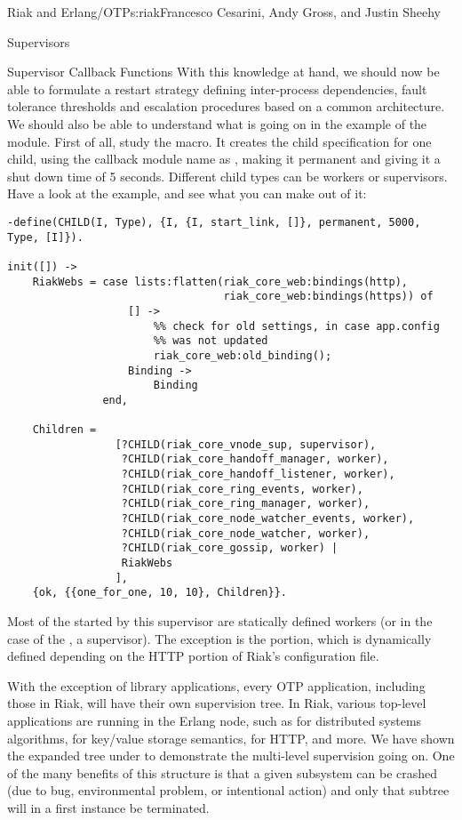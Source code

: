 \begin{aosachapter}{Riak and Erlang/OTP}{s:riak}{Francesco Cesarini, Andy Gross, and Justin Sheehy}
\begin{aosasect1}{Supervisors}
\begin{aosasect2}{Supervisor Callback Functions}
With this knowledge at hand, we should now be able to formulate a
restart strategy defining inter-process dependencies, fault tolerance
thresholds and escalation procedures based on a common
architecture. We should also be able to understand what is going on in
the  example of the 
module. First of all, study the  macro. It creates the
child specification for one child, using the callback module name as
, making it permanent and giving it a shut down time of 5
seconds. Different child types can be workers or supervisors. Have a
look at the example, and see what you can make out of it:

\begin{verbatim}
-define(CHILD(I, Type), {I, {I, start_link, []}, permanent, 5000, Type, [I]}).

init([]) ->
    RiakWebs = case lists:flatten(riak_core_web:bindings(http),
                                  riak_core_web:bindings(https)) of
                   [] ->
                       %% check for old settings, in case app.config
                       %% was not updated
                       riak_core_web:old_binding();
                   Binding ->
                       Binding
               end,

    Children =
                 [?CHILD(riak_core_vnode_sup, supervisor),
                  ?CHILD(riak_core_handoff_manager, worker),
                  ?CHILD(riak_core_handoff_listener, worker),
                  ?CHILD(riak_core_ring_events, worker),
                  ?CHILD(riak_core_ring_manager, worker),
                  ?CHILD(riak_core_node_watcher_events, worker),
                  ?CHILD(riak_core_node_watcher, worker),
                  ?CHILD(riak_core_gossip, worker) |
                  RiakWebs
                 ],
    {ok, {{one_for_one, 10, 10}, Children}}.
\end{verbatim}

Most of the  started by this supervisor are statically
defined workers (or in the case of the , a
supervisor).  The exception is the  portion, which is
dynamically defined depending on the HTTP portion of Riak's
configuration file.

With the exception of library applications, every OTP application,
including those in Riak, will have their own supervision tree. In
Riak, various top-level applications are running in the Erlang node,
such as  for distributed systems algorithms,
 for key/value storage semantics,  for
HTTP, and more.  We have shown the expanded tree under
 to demonstrate the multi-level supervision going on.
One of the many benefits of this structure is that a given subsystem
can be crashed (due to bug, environmental problem, or intentional
action) and only that subtree will in a first instance be terminated.


\end{aosasect2}
\end{aosasect1}
\end{aosachapter}

